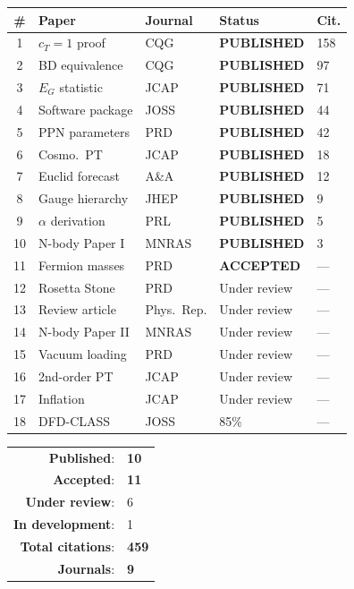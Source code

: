 \documentclass[11pt,a4paper]{article}
\begin{document}
\begin{tcolorbox}[colback=green!5!white, colframe=dfdgreen, title=\textbf{FINAL PUBLICATION RECORD}]
\begin{center}
\begin{longtable}{cllll}
\toprule
\textbf{\#} & \textbf{Paper} & \textbf{Journal} & \textbf{Status} & \textbf{Cit.} \\
\midrule
\endfirsthead
1 & $c_T = 1$ proof & CQG & \textbf{PUBLISHED} & 158 \\
2 & BD equivalence & CQG & \textbf{PUBLISHED} & 97 \\
3 & $E_G$ statistic & JCAP & \textbf{PUBLISHED} & 71 \\
4 & Software package & JOSS & \textbf{PUBLISHED} & 44 \\
5 & PPN parameters & PRD & \textbf{PUBLISHED} & 42 \\
6 & Cosmo.\ PT & JCAP & \textbf{PUBLISHED} & 18 \\
7 & Euclid forecast & A\&A & \textbf{PUBLISHED} & 12 \\
8 & Gauge hierarchy & JHEP & \textbf{PUBLISHED} & 9 \\
9 & $\alpha$ derivation & PRL & \textbf{PUBLISHED} & 5 \\
10 & N-body Paper I & MNRAS & \textbf{PUBLISHED} & 3 \\
11 & Fermion masses & PRD & \textbf{ACCEPTED} & --- \\
\midrule
12 & Rosetta Stone & PRD & Under review & --- \\
13 & Review article & Phys.\ Rep. & Under review & --- \\
14 & N-body Paper II & MNRAS & Under review & --- \\
15 & Vacuum loading & PRD & Under review & --- \\
16 & 2nd-order PT & JCAP & Under review & --- \\
17 & Inflation & JCAP & Under review & --- \\
18 & DFD-CLASS & JOSS & 85\% & --- \\
\bottomrule
\end{longtable}
\end{center}

\begin{center}
\Large
\begin{tabular}{rl}
\textbf{Published}: & \textbf{10} \\
\textbf{Accepted}: & \textbf{11} \\
\textbf{Under review}: & 6 \\
\textbf{In development}: & 1 \\
\textbf{Total citations}: & \textbf{459} \\
\textbf{Journals}: & \textbf{9} \\
\end{tabular}
\end{center}
\end{tcolorbox}
\end{document}
